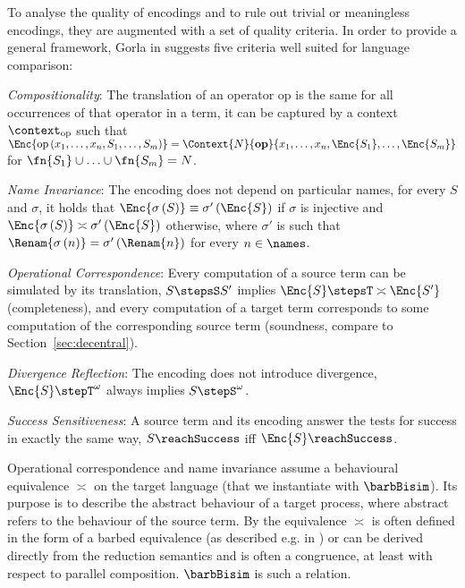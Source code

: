 \documentclass[]{eptcs}
\begin{document}
To analyse the quality of encodings and to rule out trivial or meaningless encodings, they are augmented with a set of quality criteria. In order to provide a general framework, Gorla in \cite{gorla10} suggests five criteria well suited for language comparison:
\begin{compactenum}[(1)]
	\item \emph{Compositionality}: The translation of an operator $ \mathrm{op} $ is the same for all occurrences of that operator in a term, \ie it can be captured by a context $ \context_{\mathrm{op}} $ such that $ \Enc{\mathrm{op}\left( x_1, \ldots, x_n, S_1, \ldots, S_m \right)} = \Context{N}{\mathbf{op}}{x_1, \ldots, x_n, \Enc{S_1}, \ldots, \Enc{S_m}} $ for $ \fn{S_1} \cup \ldots \cup \fn{S_m} = N $.
	\item \emph{Name Invariance}: The encoding does not depend on particular names, \ie for every $ S $ and $ \sigma $, it holds that $ \Enc{\sigma\left( S \right)} \equiv \sigma'\left( \Enc{S} \right) $ if $ \sigma $ is injective and $ \Enc{\sigma\left( S \right)} \asymp \sigma'\left( \Enc{S} \right) $ otherwise, where $ \sigma' $ is such that $ \Renam{\sigma\left( n \right)} = \sigma'\left( \Renam{n} \right) $ for every $ n \in \names $.
	\item \emph{Operational Correspondence}: Every computation of a source term can be simulated by its translation, \ie $ S \stepsS S' $ implies $ \Enc{S} \stepsT \asymp \Enc{S'} $ (completeness), and every computation of a target term corresponds to some computation of the corresponding source term (soundness, compare to Section~\ref{sec:decentral}).
	\item \emph{Divergence Reflection}: The encoding does not introduce divergence, \ie $ \Enc{S} \stepT^{\omega} $ always implies $ S \stepS^{\omega} $.
	\item \emph{Success Sensitiveness}: A source term and its encoding answer the tests for success in exactly the same way, \ie $ S \reachSuccess $ iff $ \Enc{S} \reachSuccess $.
\end{compactenum}
Operational correspondence and name invariance assume a behavioural equivalence $ \asymp $ on the target language (that we instantiate with $ \barbBisim $). Its purpose is to describe the abstract behaviour of a target process, where abstract refers to the behaviour of the source term. By \cite{gorla10} the equivalence $ \asymp $ is often defined in the form of a barbed equivalence (as described e.g. in \cite{milner.sangiorgi:barbed-bisimulation}) or can be derived directly from the reduction semantics and is often a congruence, at least with respect to parallel composition. $ \barbBisim $ is such a relation.
\end{document}
